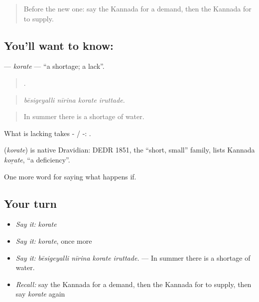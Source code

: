 \label{lesson:KA-C421-korate}



\begin{quote}
Before the new one: say the Kannada for a demand, then the Kannada for to supply.
\end{quote}

\subsection*{You'll want to know: }
\textbf{} — \emph{korate} — \textquotedblleft{}a shortage; a lack\textquotedblright{}.

\begin{quote}
   .
\end{quote}

\begin{quote}
\emph{bēsigeyalli nīrina korate iruttade.}
\end{quote}

\begin{quote}
In summer there is a shortage of water.
\end{quote}

What is lacking takes - / -:  .

\begin{cousinweb}
\textbf{} (\emph{korate}) is native Dravidian: DEDR 1851, the \textquotedblleft{}short, small\textquotedblright{} family, lists Kannada \emph{koṟate}, \textquotedblleft{}a deficiency\textquotedblright{}.
\end{cousinweb}

\begin{grammarlens}[title={What you've built}]
One more word for saying what happens if.
\end{grammarlens}

\subsection*{Your turn}
\begin{itemize}
\raggedright
  \item \emph{Say it:} \emph{korate}
  \item \emph{Say it:} \emph{korate}, once more
  \item \emph{Say it:} \emph{bēsigeyalli nīrina korate iruttade.} — In summer there is a shortage of water.
  \item \emph{Recall:} say the Kannada for a demand, then the Kannada for to supply, then say \emph{korate} again
\end{itemize}

